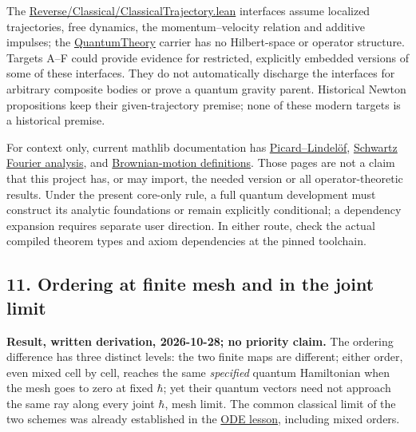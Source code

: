\documentclass[11pt,a4paper]{article}
\begin{document}
The
\href{https://github.com/arivero/newtonlean/blob/8138e9449b4f961c4adbebcb6090acc0d2fd5aaf/Reverse/Classical/ClassicalTrajectory.lean}{Reverse/Classical/ClassicalTrajectory.lean}
interfaces assume localized trajectories, free dynamics, the
momentum--velocity relation and additive impulses; the
\href{https://github.com/arivero/newtonlean/blob/8138e9449b4f961c4adbebcb6090acc0d2fd5aaf/Reverse/Parent/QuantumKKFamily.lean}{QuantumTheory}
carrier has no Hilbert-space or operator structure. Targets A--F could
provide evidence for restricted, explicitly embedded versions of some of
these interfaces. They do not automatically discharge the interfaces for
arbitrary composite bodies or prove a quantum gravity parent. Historical
Newton propositions keep their given-trajectory premise; none of these
modern targets is a historical premise.

For context only, current mathlib documentation has
\href{https://leanprover-community.github.io/mathlib4_docs/Mathlib/Analysis/ODE/ExistUnique.html}{Picard--Lindelöf},
\href{https://leanprover-community.github.io/mathlib4_docs/Mathlib/Analysis/Distribution/SchwartzSpace/Fourier.html}{Schwartz
Fourier analysis}, and
\href{https://leanprover-community.github.io/mathlib4_docs/Mathlib/Probability/BrownianMotion/Basic.html}{Brownian-motion
definitions}. Those pages are not a claim that this project has, or may
import, the needed version or all operator-theoretic results. Under the
present core-only rule, a full quantum development must construct its
analytic foundations or remain explicitly conditional; a dependency
expansion requires separate user direction. In either route, check the
actual compiled theorem types and axiom dependencies at the pinned
toolchain.

\hypertarget{ordering-at-finite-mesh-and-in-the-joint-limit}{%
\subsection{11. Ordering at finite mesh and in the joint
limit}\label{ordering-at-finite-mesh-and-in-the-joint-limit}}

\textbf{Result, written derivation, 2026-10-28; no priority claim.} The
ordering difference has three distinct levels: the two finite maps are
different; either order, even mixed cell by cell, reaches the same
\emph{specified} quantum Hamiltonian when the mesh goes to zero at fixed
\(\hbar\); yet their quantum vectors need not approach the same ray
along every joint \(\hbar\), mesh limit. The common classical limit of
the two schemes was already established in the
\href{balaban-ode-lesson.md}{ODE lesson}, including mixed orders.
\end{document}
